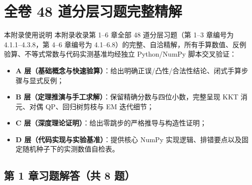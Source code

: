 \renewcommand{\chapWatermarkNum}{\thechapter}
\renewcommand{\chaptermark}[1]{\markboth{附录 \thechapter\quad #1}{}}
\chapter[全卷 48 道分层习题完整精解]{全卷 48 道分层习题完整精解}
\label{app:solutions}

\begin{chapIntro}{本附录使用说明}
本附录收录第 1--6 章全部 48 道分层习题（第 1--3 章编号为 4.1.1--4.3.8，第 4--6 章编号为 4.1--6.8）的完整、自洽精解，所有手算数值、反例验算、不等式常数与代码实测基准均经独立 Python/NumPy 脚本交叉验证：
\begin{itemize}
  \item \textbf{A 层（基础概念与快速验算）}：给出明确正误/凸性/合法性结论、闭式手算步骤与显式反例；
  \item \textbf{B 层（定理推演与手工求解）}：保留精确分数与四位小数，完整呈现 KKT 消元、对偶 QP、回归树剪枝与 EM 迭代细节；
  \item \textbf{C 层（深度理论证明）}：给出零跳步的严格推导与构造性证明；
  \item \textbf{D 层（代码实现与实验基准）}：提供核心 NumPy 实现逻辑、排错要点以及固定随机种子下的实测数值自检表。
\end{itemize}
\end{chapIntro}

\section*{第 1 章习题解答（共 8 题）}

